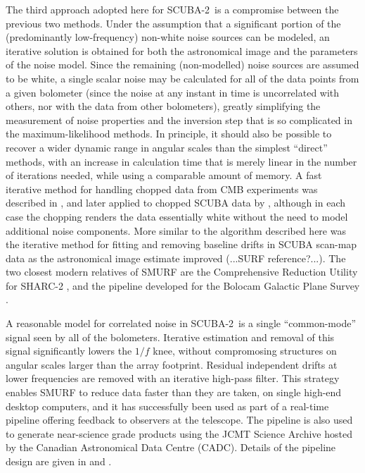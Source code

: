 \documentclass[useAMS,usenatbib,nofootinbib]{mn2e}
\newcommand{\scuba}{SCUBA-2}
\begin{document}

The third approach adopted here for \scuba\ is a compromise between
the previous two methods. Under the assumption that a significant
portion of the (predominantly low-frequency) non-white noise sources
can be modeled, an iterative solution is obtained for both the
astronomical image and the parameters of the noise model. Since the
remaining (non-modelled) noise sources are assumed to be white, a
single scalar noise may be calculated for all of the data points from
a given bolometer (since the noise at any instant in time is
uncorrelated with others, nor with the data from other bolometers),
greatly simplifying the measurement of noise properties and the
inversion step that is so complicated in the maximum-likelihood
methods. In principle, it should also be possible to recover a wider
dynamic range in angular scales than the simplest ``direct'' methods,
with an increase in calculation time that is merely linear in the
number of iterations needed, while using a comparable amount of
memory. A fast iterative method for handling chopped data from CMB
experiments was described in \citet{wright1996}, and later applied to
chopped SCUBA data by \citet{johnstone2000}, although in each case the
chopping renders the data essentially white without the need to model
additional noise components. More similar to the algorithm described
here was the iterative method for fitting and removing baseline drifts
in SCUBA scan-map data as the astronomical image estimate improved
(...SURF reference?...). The two closest modern relatives of SMURF are the
Comprehensive Reduction Utility for SHARC-2
\citep[CRUSH,][]{kovacs2008}, and the pipeline developed for the
Bolocam Galactic Plane Survey \citep{aguirre2010}.

A reasonable model for correlated noise in \scuba\ is a single
``common-mode'' signal seen by all of the bolometers. Iterative
estimation and removal of this signal significantly lowers the $1/f$
knee, without compromosing structures on angular scales larger than
the array footprint. Residual independent drifts at lower frequencies
are removed with an iterative high-pass filter. This strategy enables
SMURF to reduce data faster than they are taken, on single high-end
desktop computers, and it has successfully been used as part of a
real-time pipeline offering feedback to observers at the
telescope. The pipeline is also used to generate near-science grade
products using the JCMT Science Archive \citep{2011ASPC..442..203E}
hosted by the Canadian Astronomical Data Centre (CADC). Details of
the pipeline design are given in \citet{gibb2005} and
\citet{2008AN....329..295C}.
\end{document}
